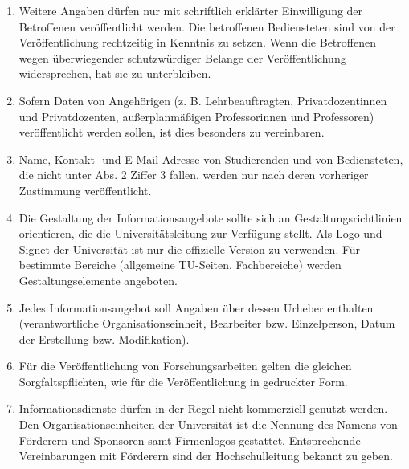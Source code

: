 \begin{enumerate}
\item Weitere Angaben dürfen nur mit schriftlich erklärter Einwilligung der Betroffenen veröffentlicht werden. Die betroffenen Bediensteten sind von der Veröffentlichung rechtzeitig in Kenntnis zu setzen. Wenn die Betroffenen wegen überwiegender schutzwürdiger Belange der Veröffentlichung widersprechen, hat sie zu unterbleiben.
\item Sofern Daten von Angehörigen (z. B. Lehrbeauftragten, Privatdozentinnen und Privatdozenten, außerplanmäßigen Professorinnen und Professoren) veröffentlicht werden sollen, ist dies besonders zu vereinbaren.
\item Name, Kontakt- und E-Mail-Adresse von Studierenden und von Bediensteten, die nicht unter Abs. 2 Ziffer 3 fallen, werden nur nach deren vorheriger Zustimmung veröffentlicht.
\item Die Gestaltung der Informationsangebote sollte sich an Gestaltungsrichtlinien orientieren, die die Universitätsleitung zur Verfügung stellt. Als Logo und Signet der Universität ist nur die offizielle Version zu verwenden. Für bestimmte Bereiche (allgemeine TU-Seiten, Fachbereiche) werden Gestaltungselemente angeboten.
\item Jedes Informationsangebot soll Angaben über dessen Urheber enthalten (verantwortliche Organisationseinheit, Bearbeiter bzw. Einzelperson, Datum der Erstellung bzw. Modifikation).
\item Für die Veröffentlichung von Forschungsarbeiten gelten die
  gleichen Sorgfaltspflichten, wie für die Veröffentlichung in
  gedruckter Form.
\item Informationsdienste dürfen in der Regel nicht kommerziell genutzt werden. Den Organisationseinheiten der Universität ist die Nennung des Namens von Förderern und Sponsoren samt Firmenlogos gestattet. Entsprechende Vereinbarungen mit Förderern sind der Hochschulleitung bekannt zu geben.
\end{enumerate}
